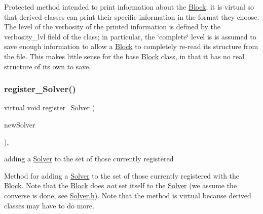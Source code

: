 Protected method intended to print information about the \mbox{\hyperlink{class_s_m_spp__di__unipi__it_1_1_block}{Block}}; it is virtual so that derived classes can print their specific information in the format they choose. The level of the verbosity of the printed information is defined by the verbosity\+\_\+lvl field of the class; in particular, the \char`\"{}complete\char`\"{} level is is assumed to save enough information to allow a \mbox{\hyperlink{class_s_m_spp__di__unipi__it_1_1_block}{Block}} to completely re-\/read its structure from the file. This makes little sense for the base \mbox{\hyperlink{class_s_m_spp__di__unipi__it_1_1_block}{Block}} class, in that it has no real structure of its own to save. \mbox{\label{class_s_m_spp__di__unipi__it_1_1_block_a4bf9d1856367faf430d0143a6ee55655}} 
\subsubsection{\texorpdfstring{register\+\_\+\+Solver()}{register\_Solver()}}
{\footnotesize\ttfamily virtual void register\+\_\+\+Solver (\begin{DoxyParamCaption}\item[{\mbox{\hyperlink{class_s_m_spp__di__unipi__it_1_1_solver}{Solver}} $\ast$}]{new\+Solver }\end{DoxyParamCaption})\hspace{0.3cm}{\ttfamily [inline]}, {\ttfamily [virtual]}}



adding a \mbox{\hyperlink{class_s_m_spp__di__unipi__it_1_1_solver}{Solver}} to the set of those currently registered 

Method for adding a \mbox{\hyperlink{class_s_m_spp__di__unipi__it_1_1_solver}{Solver}} to the set of those currently registered with the \mbox{\hyperlink{class_s_m_spp__di__unipi__it_1_1_block}{Block}}. Note that the \mbox{\hyperlink{class_s_m_spp__di__unipi__it_1_1_block}{Block}} does {\itshape not} set itself to the \mbox{\hyperlink{class_s_m_spp__di__unipi__it_1_1_solver}{Solver}} (we assume the converse is done, see \mbox{\hyperlink{_solver_8h}{Solver.\+h}}). Note that the method is virtual because derived classes may have to do more. \mbox{\label{class_s_m_spp__di__unipi__it_1_1_block_a10f535001a82e7e9950f3a69967ae56e}} 
